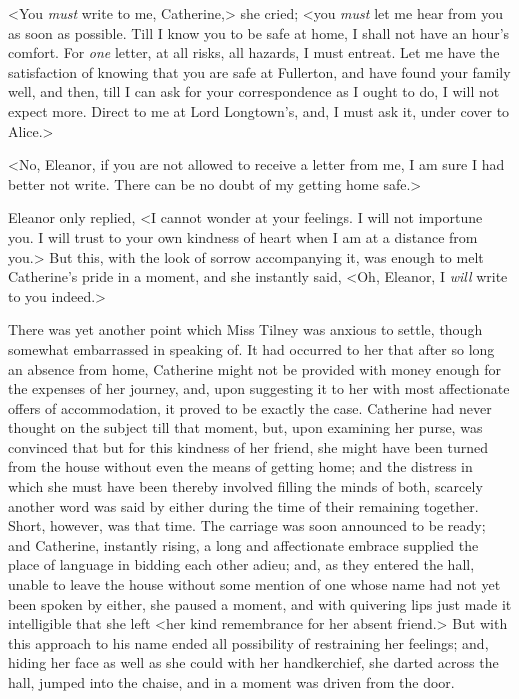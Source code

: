  <You \textit{must} write to me, Catherine,> she cried; <you \textit{must} let me hear from you as soon as possible. Till I know you to be safe at home, I shall not have an hour's comfort. For \textit{one} letter, at all risks, all hazards, I must entreat. Let me have the satisfaction of knowing that you are safe at Fullerton, and have found your family well, and then, till I can ask for your correspondence as I ought to do, I will not expect more. Direct to me at Lord Longtown's, and, I must ask it, under cover to Alice.> 

 <No, Eleanor, if you are not allowed to receive a letter from me, I am sure I had better not write. There can be no doubt of my getting home safe.> 

 Eleanor only replied, <I cannot wonder at your feelings. I will not importune you. I will trust to your own kindness of heart when I am at a distance from you.> But this, with the look of sorrow accompanying it, was enough to melt Catherine's pride in a moment, and she instantly said, <Oh, Eleanor, I \textit{will} write to you indeed.> 

 There was yet another point which Miss Tilney was anxious to settle, though somewhat embarrassed in speaking of. It had occurred to her that after so long an absence from home, Catherine might not be provided with money enough for the expenses of her journey, and, upon suggesting it to her with most affectionate offers of accommodation, it proved to be exactly the case. Catherine had never thought on the subject till that moment, but, upon examining her purse, was convinced that but for this kindness of her friend, she might have been turned from the house without even the means of getting home; and the distress in which she must have been thereby involved filling the minds of both, scarcely another word was said by either during the time of their remaining together. Short, however, was that time. The carriage was soon announced to be ready; and Catherine, instantly rising, a long and affectionate embrace supplied the place of language in bidding each other adieu; and, as they entered the hall, unable to leave the house without some mention of one whose name had not yet been spoken by either, she paused a moment, and with quivering lips just made it intelligible that she left <her kind remembrance for her absent friend.> But with this approach to his name ended all possibility of restraining her feelings; and, hiding her face as well as she could with her handkerchief, she darted across the hall, jumped into the chaise, and in a moment was driven from the door. 